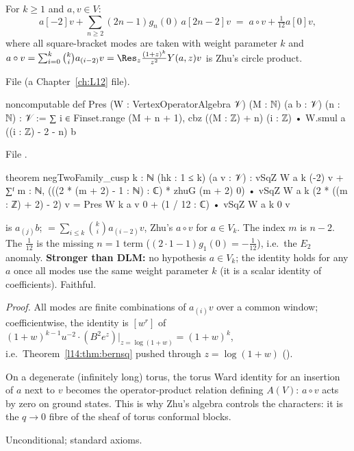 \begin{theorem}\label{l14:thm:negtwo}
For $k\ge1$ and $a,v\in V$:
\begin{equation*}
  a[-2]v + \sum_{n\ge2}(2n-1)g_n(0)\,a[2n-2]v \;=\; a\circ v + \tfrac1{12}a[0]v,
\end{equation*}
where all square-bracket modes are taken with weight parameter $k$ and $a\circ v = \sum_{i=0}^{k}\binom ki a_{(i-2)}v =
\Res_z\frac{(1+z)^k}{z^2}Y(a,z)v$ is Zhu's circle product.
\end{theorem}
\noindent File  (a Chapter~\ref{ch:L12} file).
\begin{leancode}
noncomputable def Pres (W : VertexOperatorAlgebra 𝒱) (M : ℕ) (a b : 𝒱) (n : ℕ) : 𝒱 :=
  ∑ i ∈ Finset.range (M + n + 1), cbz ((M : ℤ) + n) (i : ℤ) • W.smul a ((i : ℤ) - 2 - n) b
\end{leancode}
\noindent File .
\begin{leancode}
theorem negTwoFamily_cusp {k : ℕ} (hk : 1 ≤ k) (a v : 𝒱) :
    vSqZ W a k (-2) v
        + ∑ᶠ m : ℕ, (((2 * (m + 2) - 1 : ℕ) : ℂ) * zhuG (m + 2) 0)
            • vSqZ W a k (2 * ((m : ℤ) + 2) - 2) v
      = Pres W k a v 0 + (1 / 12 : ℂ) • vSqZ W a k 0 v
\end{leancode}
\begin{dictionary}
 is $a_{(j)}b$;  $=\sum_{i\le k}\binom ki a_{(i-2)}v$, Zhu's $a\circ v$ for
$a\in V_k$. The  index $m$ is $n-2$. The $\frac1{12}$ is the missing $n=1$ term ($(2\cdot1-1)g_1(0) = -\frac1{12}$),
i.e.\ the $E_2$ anomaly. \textbf{Stronger than DLM:} no hypothesis $a\in V_k$; the identity holds for any $a$ once all modes use
the same weight parameter $k$ (it is a scalar identity of coefficients). Faithful.
\end{dictionary}
\noindent\emph{Proof.} All modes are finite combinations of $a_{(i)}v$ over a common window; coefficientwise, the identity is
$[w^{r}]$ of $(1+w)^{k-1}u^{-2}\cdot(B^2e^z)|_{z=\log(1+w)} = (1+w)^k$, i.e.\ Theorem~\ref{l14:thm:bernsq} pushed through
$z = \log(1+w)$ ().
\begin{physics}
On a degenerate (infinitely long) torus, the torus Ward identity for an insertion of $a$ next to $v$ becomes the
operator-product relation defining $A(V)$: $a\circ v$ acts by zero on ground states. This is why Zhu's algebra controls the
characters: it is the $q\to0$ fibre of the sheaf of torus conformal blocks.
\end{physics}
\begin{status}
Unconditional; standard axioms.
\end{status}

